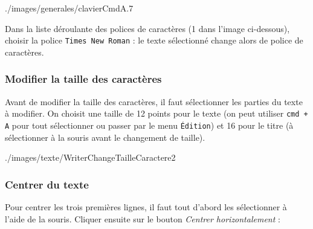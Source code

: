               {./images/generales/clavierCmdA}{.7\textwidth}

Dans la liste déroulante des polices de caractères (1 dans l'image ci-dessous), choisir la police \texttt{Times New Roman} : le texte sélectionné change alors de police de caractères.  




\subsubsection{Modifier la taille des caractères} 

Avant de modifier la taille des caractères, il faut sélectionner les parties du texte à modifier. On choisit une taille de 12 points pour le texte (on peut utiliser \texttt{cmd + A} pour tout sélectionner ou passer par le menu \texttt{Édition}) et 16 pour le titre (à sélectionner à la souris avant le changement de taille).

%
              {./images/texte/WriterChangeTailleCaractere2}{\textwidth}







\subsubsection{Centrer du texte}

Pour centrer les trois premières lignes, il faut tout d'abord les sélectionner à l'aide de la souris. Cliquer ensuite sur le bouton \emph{Centrer horizontalement} : 


%
%
%




